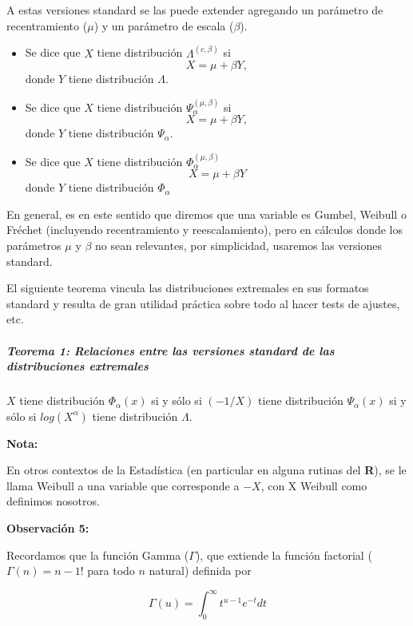 \documentclass[
  oneside]{article}
\begin{document}
A estas versiones standard se las puede extender agregando un parámetro
de recentramiento (\(\mu\)) y un parámetro de escala (\(\beta\)).

\begin{itemize}
\item Se dice que $X$ tiene distribución $\Lambda^{(c,\beta)}$ si
$$
X=\mu+\beta Y,
$$
donde $Y$ tiene distribución $\Lambda$.
\item Se dice que $X$ tiene distribución $\Psi_{\alpha}^{(\mu,\beta)}$ si 
$$
X=\mu+\beta Y,
$$
donde $Y$ tiene distribución $\Psi_{\alpha}$.

\item  Se dice que $X$ tiene distribución $\Phi_{\alpha}^{(\mu,\beta)}$ 
$$
X=\mu+\beta Y
$$
donde $Y$ tiene distribución $\Phi_{\alpha}$
\end{itemize}

En general, es en este sentido que diremos que una variable es Gumbel,
Weibull o Fréchet (incluyendo recentramiento y reescalamiento), pero en
cálculos donde los parámetros \(\mu\) y \(\beta\) no sean relevantes,
por simplicidad, usaremos las versiones standard.

\newpage

El siguiente teorema vincula las distribuciones extremales en sus
formatos standard y resulta de gran utilidad práctica sobre todo al
hacer tests de ajustes, etc.

\hypertarget{teorema-1-relaciones-entre-las-versiones-standard-de-las-distribuciones-extremales}{%
\subparagraph{Teorema 1: Relaciones entre las versiones standard de las
distribuciones
extremales}\label{teorema-1-relaciones-entre-las-versiones-standard-de-las-distribuciones-extremales}}

\(X\) tiene distribución \(\Phi_{\alpha}(x)\) si y sólo si \((-1/X)\)
tiene distribución \(\Psi_{\alpha}(x)\) si y sólo si \(log(X^{\alpha})\)
tiene distribución \(\Lambda\).

\textbf{Nota:}

En otros contextos de la Estadística (en particular en alguna rutinas
del \textbf{R}), se le llama Weibull a una variable que corresponde a
\(-X\), con X Weibull como definimos nosotros.

\textbf{Observación 5:}

Recordamos que la función Gamma (\(\Gamma\)), que extiende la función
factorial (\(\Gamma(n)=n-1!\) para todo \(n\) natural) definida por

\begin{equation}
\Gamma(u)=\int_0^{\infty}t^{u-1}e^{-t}dt
\end{equation}
\end{document}

